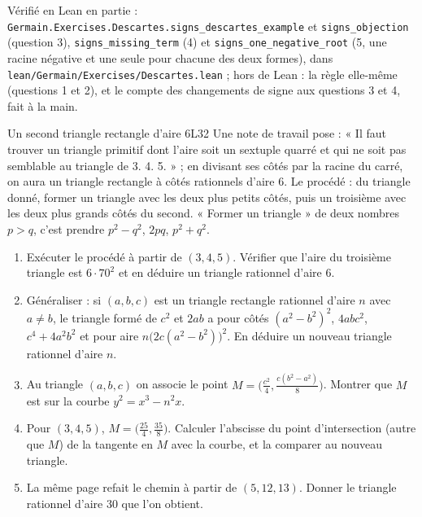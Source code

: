 \documentclass[11pt,a4paper]{article}
\begin{document}
\begin{solution}
Vérifié en Lean en partie : \texttt{Germain.Exercises.Descartes.signs\_descartes\_example}
et \texttt{signs\_objection} (question 3), \texttt{signs\_missing\_term} (4) et
\texttt{signs\_one\_negative\_root} (5, une racine négative et une seule pour chacune des deux
formes), dans \texttt{lean/Germain/Exercises/Descartes.lean} ; hors de Lean : la règle elle-même (questions 1 et 2), et
le compte des changements de signe aux questions 3 et 4, fait à la main.

\end{solution}

\begin{exercice}{Un second triangle rectangle d'aire 6}{L3}{2}
Une note de travail pose : « Il faut trouver un triangle primitif dont l'aire soit
un sextuple quarré et qui ne soit pas semblable au triangle de 3. 4. 5. » ; en
divisant ses côtés par la racine du carré, on aura un triangle rectangle à côtés
rationnels d'aire $6$. Le procédé : du triangle donné, former un triangle avec les
deux plus petits côtés, puis un troisième avec les deux plus grands côtés du
second. « Former un triangle » de deux nombres $p > q$, c'est prendre
$p^2 - q^2$, $2pq$, $p^2 + q^2$.
\begin{enumerate}
\item Exécuter le procédé à partir de $(3,4,5)$. Vérifier que l'aire du troisième
  triangle est $6\cdot 70^2$ et en déduire un triangle rationnel d'aire $6$.
\item Généraliser : si $(a, b, c)$ est un triangle rectangle rationnel d'aire $n$
  avec $a \ne b$, le triangle formé de $c^2$ et $2ab$ a pour côtés
  $(a^2 - b^2)^2$, $4abc^2$, $c^4 + 4a^2b^2$ et pour aire
  $n\bigl(2c(a^2-b^2)\bigr)^2$. En déduire un nouveau triangle rationnel d'aire $n$.
\item Au triangle $(a, b, c)$ on associe le point $M = \bigl(\frac{c^2}{4},
  \frac{c(b^2 - a^2)}{8}\bigr)$. Montrer que $M$ est sur la courbe
  $y^2 = x^3 - n^2x$.
\item Pour $(3,4,5)$, $M = \bigl(\frac{25}{4}, \frac{35}{8}\bigr)$. Calculer
  l'abscisse du point d'intersection (autre que $M$) de la tangente en $M$ avec la
  courbe, et la comparer au nouveau triangle.
\item La même page refait le chemin à partir de $(5, 12, 13)$. Donner le triangle
  rationnel d'aire $30$ que l'on obtient.
\end{enumerate}
\end{exercice}
\end{document}
